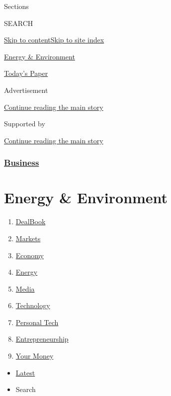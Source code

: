 Sections

SEARCH

\protect\hyperlink{site-content}{Skip to
content}\protect\hyperlink{site-index}{Skip to site index}

\href{https://www.nytimes.com/section/business/energy-environment}{Energy
\& Environment}

\href{https://myaccount.nytimes.com/auth/login?response_type=cookie\&client_id=vi}{}

\href{https://www.nytimes.com/section/todayspaper}{Today's Paper}

Advertisement

\protect\hyperlink{after-top}{Continue reading the main story}

Supported by

\protect\hyperlink{after-sponsor}{Continue reading the main story}

\hypertarget{business}{%
\subsubsection{\texorpdfstring{\href{/section/business}{Business}}{Business}}\label{business}}

\hypertarget{energy--environment}{%
\section{Energy \& Environment}\label{energy--environment}}

\begin{enumerate}
\def\labelenumi{\arabic{enumi}.}
\tightlist
\item
  \href{/pages/business/dealbook/index.html}{DealBook}
\item
  \href{https://markets.on.nytimes.com}{Markets}
\item
  \href{/section/business/economy}{Economy}
\item
  \href{/section/business/energy-environment}{Energy}
\item
  \href{/section/business/media}{Media}
\item
  \href{/section/technology}{Technology}
\item
  \href{/section/technology/personaltech}{Personal Tech}
\item
  \href{/section/business/smallbusiness}{Entrepreneurship}
\item
  \href{/section/your-money}{Your Money}
\end{enumerate}

\begin{itemize}
\tightlist
\item
  \protect\hyperlink{stream-panel}{Latest}
\item
  Search
\end{itemize}

